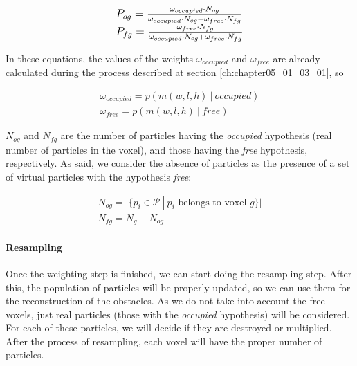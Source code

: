 \begin{equation}\label{eq:cp05_total_posterior_probabilities}
\large
\begin{array}{l}
P_{og}={{\omega_{occupied} \cdot N_{og}} \over {\omega_{occupied} \cdot N_{og} + \omega_{free} \cdot N_{fg}}} \\
P_{fg}={{\omega_{free} \cdot N_{fg}} \over {\omega_{occupied} \cdot N_{og} + \omega_{free} \cdot N_{fg}}}
\end{array}
\end{equation}

In these equations, the values of the weights $\omega_{occupied}$ and $\omega_{free}$ are already calculated during the process described at section \ref{ch:chapter05_01_03_01}, so 

\begin{equation}\label{eq:cp05_occupancy_weights}
\begin{array}{l}
\omega_{occupied} = p(m(w,l,h)~|~occupied) \\
\omega_{free} = p(m(w,l,h)~|~free)
\end{array}
\end{equation}

$N_{og}$ and $N_{fg}$ are the number of particles having the \emph{occupied} hypothesis (real number of particles in the voxel), and those having the \emph{free} hypothesis, respectively. As said, we consider the absence of particles as the presence of a set of virtual particles with the hypothesis \emph{free}:

\begin{equation}\label{eq:cp05_number_of_particles}
\begin{array}{l}
N_{og} = | \{ p_i \in \mathcal{P} ~|~ p_i \text{ belongs to voxel } g \} | \\
N_{fg} = N_g - N_{og}
\end{array}
\end{equation}

\FloatBarrier

\paragraph{Resampling}\label{ch:chapter05_01_04_02_03}

Once the weighting step is finished, we can start doing the resampling step. After this, the population of particles will be properly updated, so we can use them for the reconstruction of the obstacles. As we do not take into account the free voxels, just real particles (those with the \emph{occupied} hypothesis) will be considered. For each of these particles, we will decide if they are destroyed or multiplied. After the process of resampling, each voxel will have the proper number of particles.

